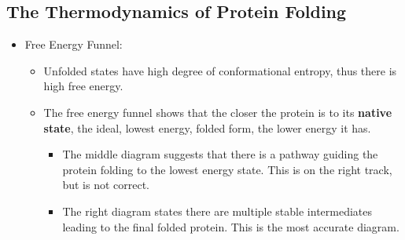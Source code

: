 \documentclass[10pt]{article}
\begin{document}
\subsection*{The Thermodynamics of Protein Folding}
\begin{itemize}
    \item Free Energy Funnel:
    \begin{itemize}
        \item Unfolded states have high degree of conformational entropy, thus there is high free energy.
        \item The free energy funnel shows that the closer the protein is to its \textbf{native state}, the ideal, lowest energy, folded form, the lower energy it has.
        \begin{itemize}
            \item The middle diagram suggests that there is a pathway guiding the protein folding to the lowest energy state.  This is on the right track, but is not correct.
            \item The right diagram states there are multiple stable intermediates leading to the final folded protein.  This is the most accurate diagram.
        \end{itemize}
    \end{itemize}
\end{itemize}
\end{document}
